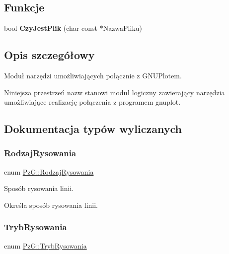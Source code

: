 \subsection*{Funkcje}
\begin{DoxyCompactItemize}
\item 
\mbox{\label{namespacePzG_ae1ae4d36f66c77879380ba73da8e20e3}} 
bool {\bfseries Czy\+Jest\+Plik} (char const $\ast$Nazwa\+Pliku)
\end{DoxyCompactItemize}


\subsection{Opis szczegółowy}
Moduł narzędzi umożliwiających połącznie z G\+N\+U\+Plotem. 

Niniejsza przestrzeń nazw stanowi moduł logiczny zawierający narzędzia umożliwiające realizację połączenia z programem {\ttfamily gnuplot}. 

\subsection{Dokumentacja typów wyliczanych}
\mbox{\label{namespacePzG_a705c92106f39b7d0c34a6739d10ff0b6}} 
\subsubsection{\texorpdfstring{Rodzaj\+Rysowania}{RodzajRysowania}}
{\footnotesize\ttfamily enum \hyperlink{namespacePzG_a705c92106f39b7d0c34a6739d10ff0b6}{Pz\+G\+::\+Rodzaj\+Rysowania}}



Sposób rysowania linii. 

Określa sposób rysowania linii. \mbox{\label{namespacePzG_aeedae1ef10c66d720f9e89de408ca4ca}} 
\subsubsection{\texorpdfstring{Tryb\+Rysowania}{TrybRysowania}}
{\footnotesize\ttfamily enum \hyperlink{namespacePzG_aeedae1ef10c66d720f9e89de408ca4ca}{Pz\+G\+::\+Tryb\+Rysowania}}



